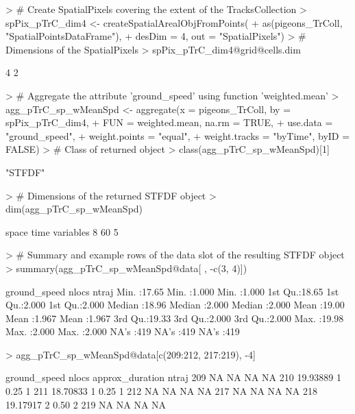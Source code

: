 \documentclass[12pt, oneside, a4paper]{scrbook}
\begin{document}
\begin{small}
\begin{Schunk}
\begin{Sinput}
> # Create SpatialPixels covering the extent of the TracksCollection
> spPix_pTrC_dim4 <- createSpatialArealObjFromPoints(
+   as(pigeons_TrColl, "SpatialPointsDataFrame"), 
+   desDim = 4, out = "SpatialPixels")
> # Dimensions of the SpatialPixels
> spPix_pTrC_dim4@grid@cells.dim
\end{Sinput}
\begin{Soutput}
[1] 4 2
\end{Soutput}
\begin{Sinput}
> # Aggregate the attribute 'ground_speed' using function 'weighted.mean'
> agg_pTrC_sp_wMeanSpd <- aggregate(x = pigeons_TrColl, by = spPix_pTrC_dim4,
+                                   FUN = weighted.mean, na.rm = TRUE,
+                                   use.data = "ground_speed",
+                                   weight.points = "equal", 
+                                   weight.tracks = "byTime", byID = FALSE)
> # Class of returned object
> class(agg_pTrC_sp_wMeanSpd)[1]
\end{Sinput}
\begin{Soutput}
[1] "STFDF"
\end{Soutput}
\begin{Sinput}
> # Dimensions of the returned STFDF object
> dim(agg_pTrC_sp_wMeanSpd)
\end{Sinput}
\begin{Soutput}
    space      time variables 
        8        60         5 
\end{Soutput}
\begin{Sinput}
> # Summary and example rows of the data slot of the resulting STFDF object
> summary(agg_pTrC_sp_wMeanSpd@data[ , -c(3, 4)])
\end{Sinput}
\begin{Soutput}
  ground_speed       nlocs           ntraj      
 Min.   :17.65   Min.   :1.000   Min.   :1.000  
 1st Qu.:18.65   1st Qu.:2.000   1st Qu.:2.000  
 Median :18.96   Median :2.000   Median :2.000  
 Mean   :19.00   Mean   :1.967   Mean   :1.967  
 3rd Qu.:19.33   3rd Qu.:2.000   3rd Qu.:2.000  
 Max.   :19.98   Max.   :2.000   Max.   :2.000  
 NA's   :419     NA's   :419     NA's   :419    
\end{Soutput}
\begin{Sinput}
> agg_pTrC_sp_wMeanSpd@data[c(209:212, 217:219), -4]
\end{Sinput}
\begin{Soutput}
    ground_speed nlocs approx_duration ntraj
209           NA    NA              NA    NA
210     19.93889     1            0.25     1
211     18.70833     1            0.25     1
212           NA    NA              NA    NA
217           NA    NA              NA    NA
218     19.17917     2            0.50     2
219           NA    NA              NA    NA
\end{Soutput}
\end{Schunk}
\end{small}
\end{document}
